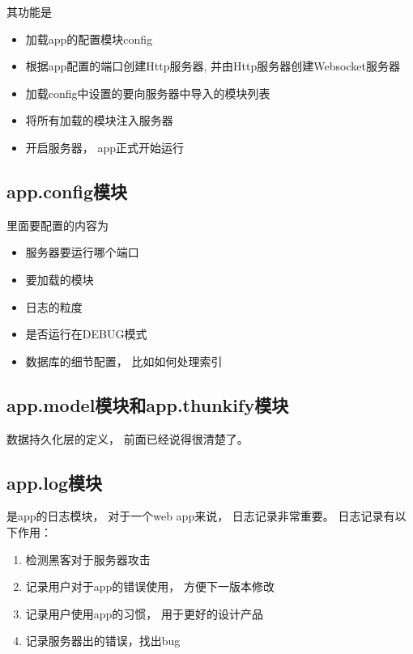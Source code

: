 其功能是

\begin{itemize}
\item 加载app的配置模块config
\item 根据app配置的端口创建Http服务器, 并由Http服务器创建Websocket服务器
\item 加载config中设置的要向服务器中导入的模块列表
\item 将所有加载的模块注入服务器
\item 开启服务器， app正式开始运行

\end{itemize}




\subsection{app.config模块}

里面要配置的内容为

\begin{itemize}
\item 服务器要运行哪个端口
\item 要加载的模块
\item 日志的粒度
\item 是否运行在DEBUG模式
\item 数据库的细节配置， 比如如何处理索引

\end{itemize}



\subsection{app.model模块和app.thunkify模块}

数据持久化层的定义， 前面已经说得很清楚了。

\subsection{app.log模块}

是app的日志模块， 对于一个web app来说， 日志记录非常重要。 日志记录有以下作用：

\begin{enumerate}
\item  检测黑客对于服务器攻击
\item 记录用户对于app的错误使用， 方便下一版本修改
\item 记录用户使用app的习惯， 用于更好的设计产品
\item 记录服务器出的错误，找出bug
\end{enumerate}



